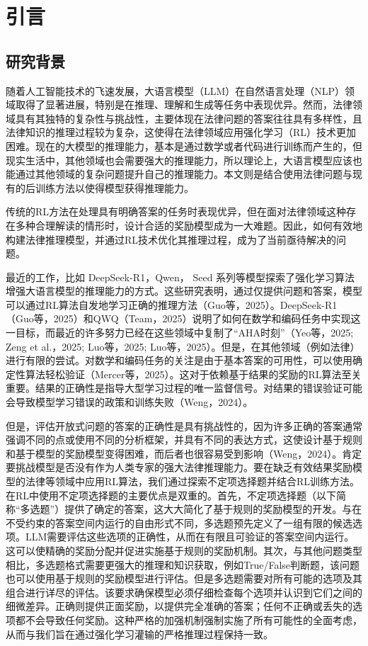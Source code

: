 \documentclass{pkuthesis}
\begin{document}
\newpage

\section{引言}
\subsection{研究背景}
随着人工智能技术的飞速发展，大语言模型（LLM）在自然语言处理（NLP）领域取得了显著进展，特别是在推理、理解和生成等任务中表现优异。然而，法律领域具有其独特的复杂性与挑战性，主要体现在法律问题的答案往往具有多样性，且法律知识的推理过程较为复杂，这使得在法律领域应用强化学习（RL）技术更加困难。现在的大模型的推理能力，基本是通过数学或者代码进行训练而产生的，但现实生活中，其他领域也会需要强大的推理能力，所以理论上，大语言模型应该也能通过其他领域的复杂问题提升自己的推理能力。本文则是结合使用法律问题与现有的后训练方法以使得模型获得推理能力。

传统的RL方法在处理具有明确答案的任务时表现优异，但在面对法律领域这种存在多种合理解读的情形时，设计合适的奖励模型成为一大难题。因此，如何有效地构建法律推理模型，并通过RL技术优化其推理过程，成为了当前亟待解决的问题。

最近的工作，比如 DeepSeek-R1，Qwen， Seed 系列等模型探索了强化学习算法增强大语言模型的推理能力的方式。这些研究表明，通过仅提供问题和答案，模型可以通过RL算法自发地学习正确的推理方法（Guo等，2025）。DeepSeek-R1（Guo等，2025）和QWQ（Team，2025）说明了如何在数学和编码任务中实现这一目标，而最近的许多努力已经在这些领域中复制了“AHA时刻”（Yeo等，2025; Zeng et al.，2025; Luo等，2025; Luo等，2025）。但是，在其他领域（例如法律）进行有限的尝试。对数学和编码任务的关注是由于基本答案的可用性，可以使用确定性算法轻松验证（Mercer等，2025）。这对于依赖基于结果的奖励的RL算法至关重要。结果的正确性是指导大型学习过程的唯一监督信号。对结果的错误验证可能会导致模型学习错误的政策和训练失败（Weng，2024）。

但是，评估开放式问题的答案的正确性是具有挑战性的，因为许多正确的答案通常强调不同的点或使用不同的分析框架，并具有不同的表达方式，这使设计基于规则和基于模型的奖励模型变得困难，而后者也很容易受到影响（Weng，2024）。肯定要挑战模型是否没有作为人类专家的强大法律推理能力。要在缺乏有效结果奖励模型的法律等领域中应用RL算法，我们通过探索不定项选择题并结合RL训练方法。在RL中使用不定项选择题的主要优点是双重的。首先，不定项选择题（以下简称“多选题”）提供了确定的答案，这大大简化了基于规则的奖励模型的开发。与在不受约束的答案空间内运行的自由形式不同，多选题预先定义了一组有限的候选选项。LLM需要评估这些选项的正确性，从而在有限且可验证的答案空间内运行。这可以使精确的奖励分配并促进实施基于规则的奖励机制。其次，与其他问题类型相比，多选题格式需要更强大的推理和知识获取，例如True/False判断题，该问题也可以使用基于规则的奖励模型进行评估。但是多选题需要对所有可能的选项及其组合进行详尽的评估。该要求确保模型必须仔细检查每个选项并认识到它们之间的细微差异。正确则提供正面奖励，以提供完全准确的答案；任何不正确或丢失的选项都不会导致任何奖励。这种严格的加强机制强制实施了所有可能性的全面考虑，从而与我们旨在通过强化学习灌输的严格推理过程保持一致。
\end{document}
